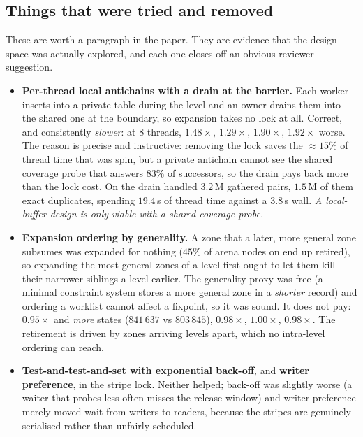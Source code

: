 \subsection{Things that were tried and removed}

These are worth a paragraph in the paper.  They are evidence that the design
space was actually explored, and each one closes off an obvious reviewer
suggestion.

\begin{itemize}[leftmargin=1.2em, itemsep=3pt]
\item \textbf{Per-thread local antichains with a drain at the barrier.}  Each
      worker inserts into a private table during the level and an owner drains
      them into the shared one at the boundary, so expansion takes no lock at
      all.  Correct, and consistently \emph{slower}: at $8$ threads,
       $1.48\times$,  $1.29\times$,
       $1.90\times$,  $1.92\times$ worse.  The
      reason is precise and instructive: removing the lock saves the $\approx
      15\%$ of thread time that was spin, but a private antichain cannot see the
      shared coverage probe that answers $83\%$ of successors, so the drain
      pays back more than the lock cost.  On  the drain handled
      $3.2$\,M gathered pairs, $1.5$\,M of them exact duplicates, spending
      $19.4$\,s of thread time against a $3.8$\,s wall.  \emph{A local-buffer
      design is only viable with a shared coverage probe.}

\item \textbf{Expansion ordering by generality.}  A zone that a later, more
      general zone subsumes was expanded for nothing ($45\%$ of arena nodes on
       end up retired), so expanding the most general zones of a
      level first ought to let them kill their narrower siblings a level
      earlier.  The generality proxy was free (a minimal constraint system
      stores a more general zone in a \emph{shorter} record) and ordering a
      worklist cannot affect a fixpoint, so it was sound.  It does not pay:
       $0.95\times$ and \emph{more} states ($841\,637$ vs
      $803\,845$),  $0.98\times$, 
      $1.00\times$,  $0.98\times$.  The retirement is driven by
      zones arriving levels apart, which no intra-level ordering can reach.

\item \textbf{Test-and-test-and-set with exponential back-off}, and
      \textbf{writer preference}, in the stripe lock.  Neither helped; back-off
      was slightly worse (a waiter that probes less often misses the release
      window) and writer preference merely moved wait from writers to readers,
      because the stripes are genuinely serialised rather than unfairly
      scheduled.
\end{itemize}


